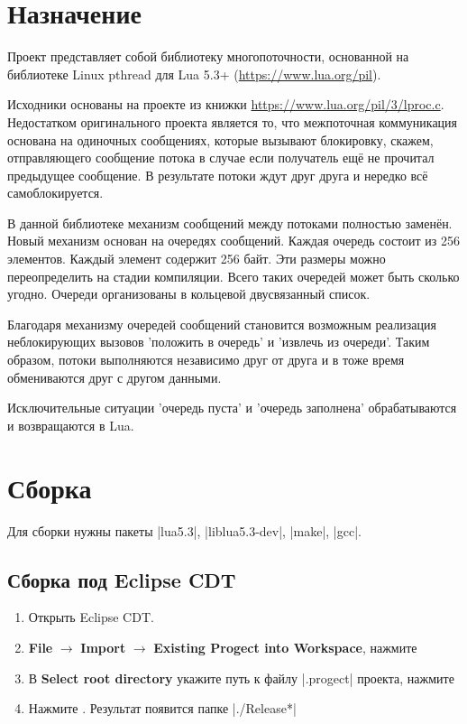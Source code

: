 \documentclass[a4paper,12pt,russian, oneside]{article}
\renewcommand{\verb}{\collectverb{\color{Violet}}}
\begin{document}
\newpage
\pagestyle{plain} %
\tableofcontents %

\newpage

\section{Назначение}


Проект представляет собой библиотеку многопоточности,
основанной на библиотеке Linux pthread для Lua 5.3+ (\url{https://www.lua.org/pil}).

Исходники основаны на проекте из книжки \url{https://www.lua.org/pil/3/lproc.c}.
Недостатком оригинального проекта является то, что межпоточная коммуникация
основана на одиночных сообщениях, которые вызывают блокировку, скажем,
отправляющего сообщение потока в случае если получатель ещё не прочитал
предыдущее сообщение. В результате потоки ждут друг друга и нередко
всё самоблокируется.

В данной библиотеке механизм сообщений между потоками полностью заменён.
Новый механизм основан на очередях сообщений. Каждая очередь состоит из 256
элементов. Каждый элемент содержит 256 байт. Эти размеры можно переопределить
на стадии компиляции. Всего таких очередей может быть сколько угодно. Очереди
организованы в кольцевой двусвязанный список.

Благодаря механизму очередей сообщений становится возможным реализация 
неблокирующих вызовов 'положить в очередь' и 'извлечь из очереди'. Таким
образом, потоки выполняются независимо друг от друга и в тоже время обмениваются
друг с другом данными.

Исключительные ситуации 'очередь пуста' и 'очередь заполнена' обрабатываются и
возвращаются в Lua.


\newpage
\section{Сборка}

Для сборки нужны пакеты \verb|lua5.3|, \verb|liblua5.3-dev|, \verb|make|, \verb|gcc|.


\subsection{Сборка под Eclipse CDT}

\begin{enumerate}
\item Открыть Eclipse CDT.

\item \textbf{File} $\rightarrow$ \textbf{Import} $\rightarrow$ \textbf{Existing Progect into Workspace}, нажмите 

\item В \textbf{Select root directory} укажите путь к файлу \verb|.progect| проекта, нажмите 

\item Нажмите . Результат появится папке \verb|./Release*|
\end{enumerate}
\end{document}
